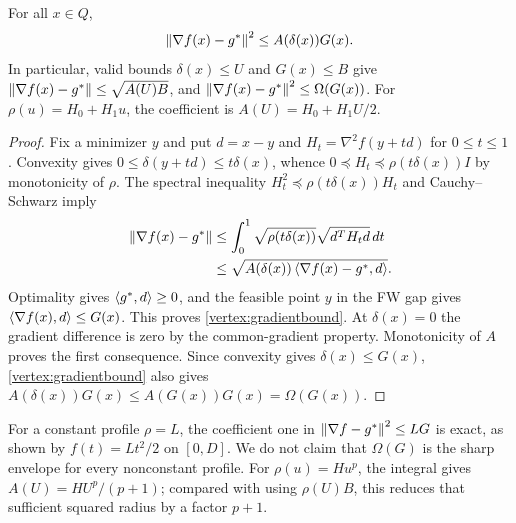 \begin{proposition}
\label{vertex:radius}
For all $x\in Q$,
\begin{equation}\label{vertex:gradientbound}
 \left\|\nabla f(x)-g^*\right\|^2\le A(\delta(x))G(x).
\end{equation}
In particular, valid bounds $\delta(x)\le U$ and $G(x)\le B$ give
$\left\|\nabla f(x)-g^*\right\|\le\sqrt{A(U)B}$, and
$\left\|\nabla f(x)-g^*\right\|^2\le\Omega(G(x))$. For
$\rho(u)=H_0+H_1u$, the coefficient is
$A(U)=H_0+H_1U/2$.
\end{proposition}
\begin{proof}
Fix a minimizer $y$ and put $d=x-y$ and
$H_t=\nabla^2 f(y+td)$ for $0\le t\le1$. Convexity gives
$0\le\delta(y+td)\le t\delta(x)$, whence
$0\preceq H_t\preceq\rho(t\delta(x))I$ by monotonicity of $\rho$.
The spectral inequality
$H_t^2\preceq\rho(t\delta(x))H_t$ and Cauchy--Schwarz imply
\begin{align*}
 \left\|\nabla f(x)-g^*\right\|
 &\le\int_0^1\sqrt{\rho(t\delta(x))}
             \sqrt{d^TH_td}\,dt\\
 &\le\sqrt{A(\delta(x))\left\langle\nabla f(x)-g^*,d\right\rangle}.
\end{align*}
Optimality gives $\left\langle g^*,d\right\rangle\ge0$, and the feasible point $y$
in the FW gap gives $\left\langle\nabla f(x),d\right\rangle\le G(x)$. This proves
\eqref{vertex:gradientbound}. At $\delta(x)=0$ the gradient difference
is zero by the common-gradient property. Monotonicity of $A$ proves
the first consequence. Since convexity gives $\delta(x)\le G(x)$,
\eqref{vertex:gradientbound} also gives
$A(\delta(x))G(x)\le A(G(x))G(x)=\Omega(G(x))$.
\end{proof}

For a constant profile $\rho=L$, the coefficient one in
$\left\|\nabla f-g^*\right\|^2\le LG$ is exact, as shown by
$f(t)=Lt^2/2$ on $[0,D]$. We do not claim that $\Omega(G)$ is the
sharp envelope for every nonconstant profile. For $\rho(u)=Hu^p$,
the integral gives $A(U)=HU^p/(p+1)$; compared with using $\rho(U)B$,
this reduces that sufficient squared radius by a factor $p+1$.

